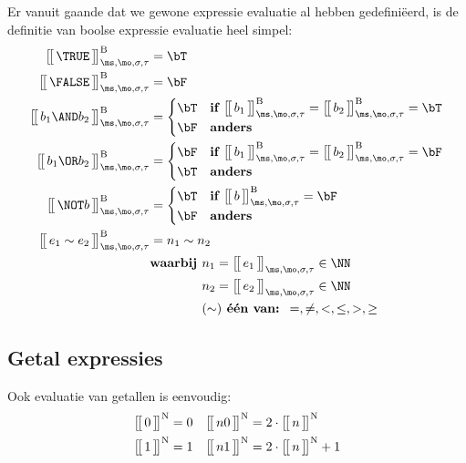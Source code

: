 Er vanuit gaande dat we gewone expressie evaluatie al hebben gedefiniëerd, is de definitie van boolse expressie evaluatie heel simpel:
%
\begin{align*}
  \Express[B]{\TRUE}{\ms,\mo,\sigma,\tau} &= \bT \\
  \Express[B]{\FALSE}{\ms,\mo,\sigma,\tau} &= \bF \\
  \Express[B]{b_1 \AND b_2}{\ms,\mo,\sigma,\tau}
  &= \begin{cases}
    \bT & \textbf{if } \Express[B]{b_1}{\ms,\mo,\sigma,\tau} = \Express[B]{b_2}{\ms,\mo,\sigma,\tau} = \bT \\
    \bF & \textbf{anders}
  \end{cases} \\
  \Express[B]{b_1 \OR b_2}{\ms,\mo,\sigma,\tau}
  &= \begin{cases}
    \bF & \textbf{if } \Express[B]{b_1}{\ms,\mo,\sigma,\tau} = \Express[B]{b_2}{\ms,\mo,\sigma,\tau} = \bF \\
    \bT & \textbf{anders}
  \end{cases} \\
  \Express[B]{\NOT b}{\ms,\mo,\sigma,\tau}
  &= \begin{cases}
    \bT & \textbf{if } \Express[B]{b}{\ms,\mo,\sigma,\tau} = \bF \\
    \bF & \textbf{anders}
  \end{cases} \\
  \Express[B]{e_1 \sim e_2}{\ms,\mo,\sigma,\tau} &=
  n_1 \sim n_2 \\
  & \textbf{waarbij } n_1 = \Express{e_1}{\ms,\mo,\sigma,\tau} \in \NN \\
  & \phantom{\textbf{waarbij }} n_2 = \Express{e_2}{\ms,\mo,\sigma,\tau} \in \NN \\
  & \phantom{\textbf{waarbij }} (\sim) \textbf{ één van: } =, \neq, <, \le, >, \ge
\end{align*}

\subsection{Getal expressies}

Ook evaluatie van getallen is eenvoudig:
%
\begin{align*}
  \Express[N]{0}{} &= 0 &
  \Express[N]{n 0}{} &= 2 \cdot \Express[N]{n}{} \\
  \Express[N]{1}{} &= 1 &
  \Express[N]{n 1}{} &= 2 \cdot \Express[N]{n}{} + 1
\end{align*}

